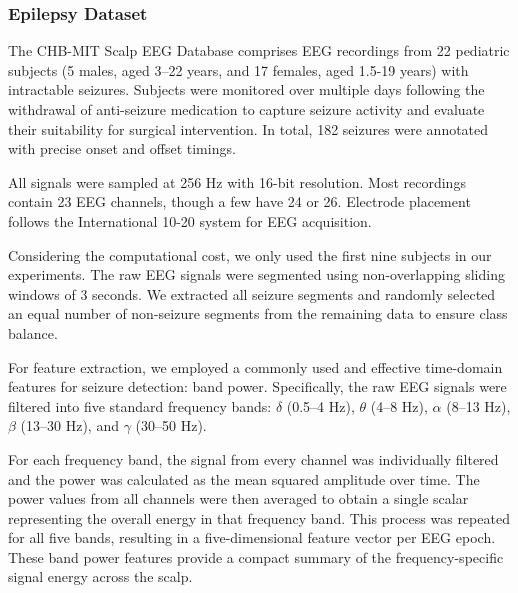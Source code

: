 \documentclass[journal,twocolumn]{IEEEtran}
\begin{document}
\subsubsection{Epilepsy Dataset}
The CHB-MIT Scalp EEG Database comprises EEG recordings from 22 pediatric subjects (5 males, aged 3–22 years, and 17 females, aged 1.5-19 years) with intractable seizures. Subjects were monitored over multiple days following the withdrawal of anti-seizure medication to capture seizure activity and evaluate their suitability for surgical intervention. In total, 182 seizures were annotated with precise onset and offset timings.

All signals were sampled at 256 Hz with 16-bit resolution. Most recordings contain 23 EEG channels, though a few have 24 or 26. Electrode placement follows the International 10-20 system for EEG acquisition.

Considering the computational cost, we only used the first nine subjects in our experiments. The raw EEG signals were segmented using non-overlapping sliding windows of 3 seconds. We extracted all seizure segments and randomly selected an equal number of non-seizure segments from the remaining data to ensure class balance.

For feature extraction, we employed a commonly used and effective time-domain features for seizure detection: band power. Specifically, the raw EEG signals were filtered into five standard frequency bands: $\delta$ (0.5–4 Hz), $\theta$ (4–8 Hz), $\alpha$ (8–13 Hz), $\beta$ (13–30 Hz), and $\gamma$ (30–50 Hz). 

For each frequency band, the signal from every channel was individually filtered and the power was calculated as the mean squared amplitude over time. The power values from all channels were then averaged to obtain a single scalar representing the overall energy in that frequency band. This process was repeated for all five bands, resulting in a five-dimensional feature vector per EEG epoch. These band power features provide a compact summary of the frequency-specific signal energy across the scalp.
\end{document}
